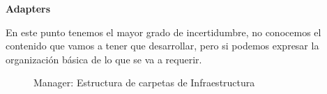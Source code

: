 \textbf{Adapters}

En este punto tenemos el mayor grado de incertidumbre, no conocemos el contenido que vamos a tener que desarrollar, pero si podemos expresar la organización básica de lo que se va a requerir.

\begin{figure}[H]
    \setlength{\DTbaselineskip}{10pt}
    \DTsetlength{0.2em}{1em}{0.2em}{0.4pt}{1.6pt}
    \caption{Manager: Estructura de carpetas de Infraestructura}\label{fig:ManagerEstructura de carpetas de Infraestructura}
\end{figure}
